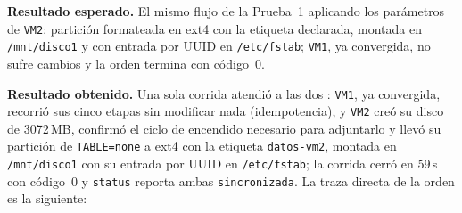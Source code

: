 \textbf{Resultado esperado.} El mismo flujo de la Prueba~1 aplicando los parámetros de \texttt{VM2}: partición formateada en ext4 con la etiqueta declarada, montada en \texttt{/mnt/disco1} y con entrada por UUID en \texttt{/etc/fstab}; \texttt{VM1}, ya convergida, no sufre cambios y la orden termina con código~0.

\textbf{Resultado obtenido.} Una sola corrida atendió a las dos \vm{}: \texttt{VM1}, ya convergida, recorrió sus cinco etapas sin modificar nada (idempotencia), y \texttt{VM2} creó su disco de 3072\,MB, confirmó el ciclo de encendido necesario para adjuntarlo y llevó su partición de \texttt{TABLE=none} a ext4 con la etiqueta \texttt{datos-vm2}, montada en \texttt{/mnt/disco1} con su entrada por UUID en \texttt{/etc/fstab}; la corrida cerró en 59\,s con código~0 y \texttt{status} reporta ambas \texttt{sincronizada}. La traza directa de la orden es la siguiente:

